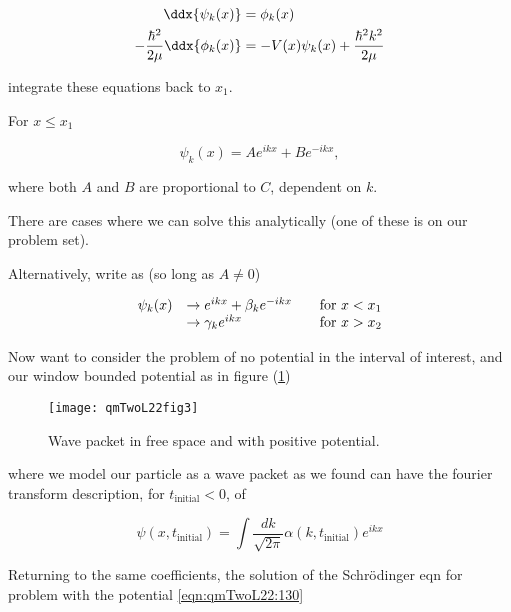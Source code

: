 \begin{align}\label{eqn:qmTwoL22:90}
\ddx{\psi_k(x)} &= \phi_k(x) \\
-\frac{\hbar^2}{2 \mu} \ddx{\phi_k(x)} &= - V(x) \psi_k(x) + \frac{\hbar^2 k^2}{2 \mu}
\end{align}

integrate these equations back to $x_1$.

For $x \le x_1$

\begin{equation}\label{eqn:qmTwoL22:110}
\psi_k(x) = A e^{i k x} + B e^{-i k x},
\end{equation}

where both $A$ and $B$ are proportional to $C$, dependent on $k$.

There are cases where we can solve this analytically (one of these is on our problem set).

Alternatively, write as (so long as $A \ne 0$)

\begin{equation}\label{eqn:qmTwoL22:130}
\begin{array}{l l l}
\psi_k(x)
&\rightarrow e^{i k x} + \beta_k e^{-i k x} & \quad \mbox{for $x < x_1$} \\
&\rightarrow \gamma_k e^{i k x} & \quad \mbox{for $x > x_2$}
\end{array}
\end{equation}

Now want to consider the problem of no potential in the interval of interest, and our window bounded potential as in figure (\ref{fig:qmTwoL22:qmTwoL22fig3})

\begin{figure}[htp]
   \centering
   \texttt{[image: qmTwoL22fig3]}
   \caption{Wave packet in free space and with positive potential.}\label{fig:qmTwoL22:qmTwoL22fig3}
\end{figure}

where we model our particle as a wave packet as we found can have the fourier transform description, for $t_{\text{initial}} < 0$, of

\begin{equation}\label{eqn:qmTwoL22:150}
\psi(x, t_{\text{initial}}) = \int \frac{dk}{\sqrt{2 \pi}} \alpha(k, t_{\text{initial}}) e^{i k x}
\end{equation}

Returning to the same coefficients, the solution of the Schr\"{o}dinger eqn for problem with the potential \ref{eqn:qmTwoL22:130}

